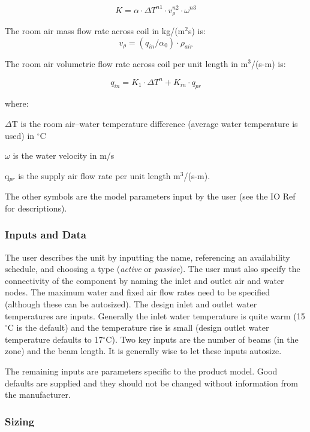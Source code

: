 \begin{equation}
K = \alpha·\Delta T^{n1}·v_{\rho}^{n2}·\omega^{n3}
\end{equation}

The room air mass flow rate across coil in kg/(m\(^{2}\)s) is:
\begin{equation}
v_{\rho} = (q_{in} / \alpha_{0})·\rho_{air}
\end{equation}

The room air volumetric flow rate across coil per unit length in m\(^{3}\)/(s-m) is:

\begin{equation}
q_{in} = K_{1}·\Delta T^{n} + K_{in}·q_{pr}
\end{equation}
 
where:
 
\(\Delta\)T is the room air--water temperature difference (average water temperature is used) in \(^{\circ}\)C

\(\omega\) is the water velocity in m/s

q\(_{pr}\) is the supply air flow rate per unit length m\(^{3}\)/(s-m).

The other symbols are the model parameters input by the user (see the IO Ref for descriptions).

\subsubsection{Inputs and Data}\label{inputs-and-data-3}

The user describes the unit by inputting the name, referencing an availability schedule, and choosing a type (\emph{active} or \emph{passive}). The user must also specify the connectivity of the component by naming the inlet and outlet air and water nodes. The maximum water and fixed air flow rates need to be specified (although these can be autosized). The design inlet and outlet water temperatures are inputs. Generally the inlet water temperature is quite warm (15\(^{\circ}\)C is the default) and the temperature rise is small (design outlet water temperature defaults to 17\(^{\circ}\)C). Two key inputs are the number of beams (in the zone) and the beam length. It is generally wise to let these inputs autosize.

The remaining inputs are parameters specific to the product model. Good defaults are supplied and they should not be changed without information from the manufacturer.

\subsubsection{Sizing}\label{sizing}

